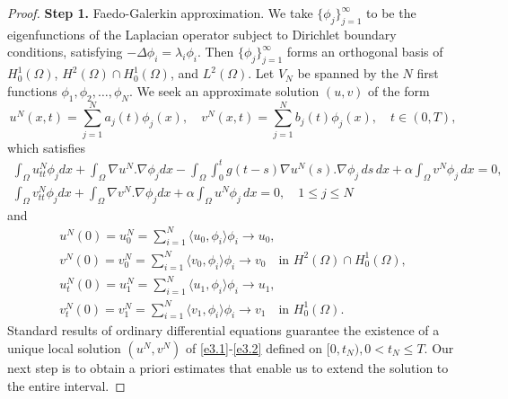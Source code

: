\documentclass[11pt]{article}
\numberwithin{equation}{section}
\begin{document}
\begin{proof} \quad

\noindent\textbf{Step 1.} Faedo-Galerkin approximation.
We take
\(\{ \phi_j \}_{j=1}^\infty\)
to be the eigenfunctions of the Laplacian operator subject to Dirichlet boundary conditions, satisfying $-\Delta \phi_i = \lambda_i \phi_i $. Then
$\{\phi_j\}_{j=1}^\infty$ forms an orthogonal basis of $ H_0^1(\Omega)$,
\( H^2(\Omega) \cap H_0^1(\Omega) \), and \( L^2(\Omega) \).
Let $V_{N}$ be spanned by the $N$ first functions $ \phi_1, \phi_2, \dots, \phi_N $.
We seek  an approximate solution $(u,v)$ of the form
\[
u^N(x,t) = \sum_{j=1}^N a_j(t) \phi_j(x), \quad
v^N(x,t) = \sum_{j=1}^N b_j(t) \phi_j(x), \quad t\in (0,T),
\]
which satisfies
\begin{gather*}
\int_\Omega u_{tt}^N \phi_j dx + \int_\Omega \nabla u^N .\nabla \phi_j dx - \int_\Omega \int_0^t g(t-s) \nabla u^N(s) .\nabla \phi_j\, ds\,dx+ \alpha \int_\Omega v^N \phi_j \, dx = 0,\\
\int_\Omega v_{tt}^N \phi_j dx + \int_\Omega \nabla v^N .\nabla \phi_j dx+ \alpha \int_\Omega u^N \phi_j \, dx = 0,\quad 1\leq j\leq N
\label{e3.1}
\end{gather*}
and
\begin{equation} \label{e3.2}
\begin{gathered}
 u^{N}(0) = u^{N}_0= \sum_{i=1}^{N} \langle u_0, \phi_i \rangle \phi_i
 \to u_0, \\
  v^{N}(0) = v^{N}_0 = \sum_{i=1}^{N} \langle v_0, \phi_i \rangle \phi_i
 \to v_0 \quad \text{in } H^2(\Omega) \cap H_0^1(\Omega), \\
 u_{t}^N(0) = u_1^N = \sum_{i=1}^{N} \langle u_1, \phi_i \rangle \phi_i \to u_{1}, \\
 v_{t}^N(0) = v_1^N = \sum_{i=1}^{N} \langle v_1, \phi_i \rangle \phi_i \to v_{1} \quad \text{in } H^1_0(\Omega).
 \end{gathered}
\end{equation}
Standard results of ordinary differential equations guarantee the existence of
a unique local solution
$ (u^N, v^N )$ of \eqref{e3.1}-\eqref{e3.2} defined on
$ [0, t_{N}), 0 < t_{N} \leq T $.
Our next step is to obtain a priori estimates that enable us to extend the
solution to the entire interval.
\smallskip


\end{proof}
\end{document}
